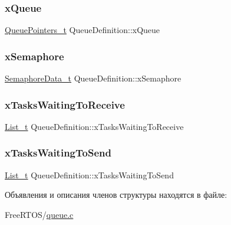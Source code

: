 \subsubsection{\texorpdfstring{xQueue}{xQueue}}
{\footnotesize\ttfamily \mbox{\hyperlink{queue_8c_ad04ba6edfecdbdee6406cdd62a72671c}{Queue\+Pointers\+\_\+t}} Queue\+Definition\+::x\+Queue}

\mbox{\label{struct_queue_definition_adb2c0818274974553c619ff953b6f477}} 
\subsubsection{\texorpdfstring{xSemaphore}{xSemaphore}}
{\footnotesize\ttfamily \mbox{\hyperlink{queue_8c_a37643b46fd5893e70242848a22aef310}{Semaphore\+Data\+\_\+t}} Queue\+Definition\+::x\+Semaphore}

\mbox{\label{struct_queue_definition_af6d61526f77beee659cd604a0c473359}} 
\subsubsection{\texorpdfstring{xTasksWaitingToReceive}{xTasksWaitingToReceive}}
{\footnotesize\ttfamily \mbox{\hyperlink{list_8h_afd590ef6400071b4d63d65ef90bea7f4}{List\+\_\+t}} Queue\+Definition\+::x\+Tasks\+Waiting\+To\+Receive}

\mbox{\label{struct_queue_definition_aaab135c4345cb0393d6ff3cd5164c7b2}} 
\subsubsection{\texorpdfstring{xTasksWaitingToSend}{xTasksWaitingToSend}}
{\footnotesize\ttfamily \mbox{\hyperlink{list_8h_afd590ef6400071b4d63d65ef90bea7f4}{List\+\_\+t}} Queue\+Definition\+::x\+Tasks\+Waiting\+To\+Send}



Объявления и описания членов структуры находятся в файле\+:\begin{DoxyCompactItemize}
\item 
Free\+R\+T\+O\+S/\mbox{\hyperlink{queue_8c}{queue.\+c}}\end{DoxyCompactItemize}
